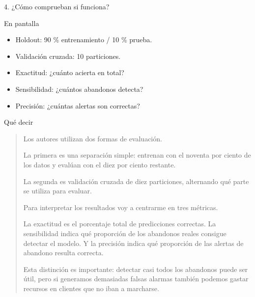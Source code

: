 \documentclass[presentation]{beamer}
\begin{document}
\begin{frame}[label={sec:orgffe29df}]{4. ¿Cómo comprueban si funciona?}
\begin{block}{En pantalla}
\begin{itemize}
\item Holdout: 90 \% entrenamiento / 10 \% prueba.
\item Validación cruzada: 10 particiones.
\item Exactitud: ¿cuánto acierta en total?
\item Sensibilidad: ¿cuántos abandonos detecta?
\item Precisión: ¿cuántas alertas son correctas?
\end{itemize}
\end{block}
\begin{block}{Qué decir}
\begin{quote}
Los autores utilizan dos formas de evaluación.

La primera es una separación simple: entrenan con el noventa por ciento de los datos y evalúan con el diez por ciento restante.

La segunda es validación cruzada de diez particiones, alternando qué parte se utiliza para evaluar.

Para interpretar los resultados voy a centrarme en tres métricas.

La exactitud es el porcentaje total de predicciones correctas. La sensibilidad indica qué proporción de los abandonos reales consigue detectar el modelo. Y la precisión indica qué proporción de las alertas de abandono resulta correcta.

Esta distinción es importante: detectar casi todos los abandonos puede ser útil, pero si generamos demasiadas falsas alarmas también podemos gastar recursos en clientes que no iban a marcharse.
\end{quote}
\end{block}
\end{frame}
\end{document}
